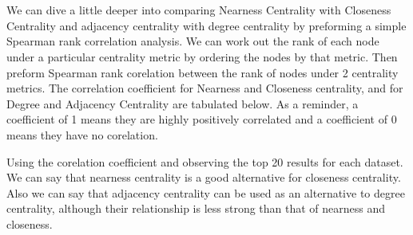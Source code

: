 \section{}


\section{}


We can dive a little deeper into comparing Nearness Centrality with Closeness Centrality and adjacency centrality with degree centrality by preforming a simple Spearman rank correlation analysis.
We can work out the rank of each node under a particular centrality metric by ordering the nodes by that metric.
Then preform Spearman rank corelation between the rank of nodes under 2 centrality metrics.
The correlation coefficient for Nearness and Closeness centrality, and for Degree and Adjacency Centrality are tabulated below. 
As a reminder, a coefficient of 1 means they are highly positively correlated and a coefficient of 0 means they have no corelation. 



Using the corelation coefficient and observing the top 20 results for each dataset.
We can say that nearness centrality is a good alternative for closeness centrality.
Also we can say that adjacency centrality can be used as an alternative to degree centrality, although their relationship is less strong than that of nearness and closeness. 

